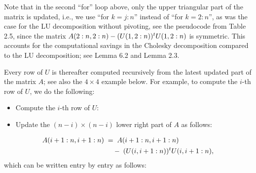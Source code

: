 Note that in the second ``for'' loop above, only the upper triangular part of the
matrix is updated, i.e., we use ``for $k = j:n$'' instead of ``for $k = 2:n$'', as was
the case for the LU decomposition without pivoting, see the pseudocode from Table 2.5,
since the matrix $A(2:n,2:n) - (U(1,2:n))^{t} U(1,2:n)$ is symmetric. This accounts for
the computational savings in the Cholesky decomposition compared to the LU
decomposition; see Lemma 6.2 and Lemma 2.3.

Every row of $U$ is thereafter computed recursively from the latest updated part of the
matrix $A$; see also the $4 \times 4$ example below. For example, to compute the
$i$-th row of $U$, we do the following:

\begin{itemize}
\item Compute the $i$-th row of $U$:
\end{itemize}

\begin{center}
\end{center}

\begin{itemize}
\item Update the $(n-i) \times (n-i)$ lower right part of $A$ as follows:
\end{itemize}
\begin{equation}
\begin{split}
A(i+1:n,i+1:n) \;&=\; A(i+1:n,i+1:n) \\
&\quad -\; (U(i,i+1:n))^{t} U(i,i+1:n),
\end{split}
\end{equation}
which can be written entry by entry as follows:

\begin{center}
\end{center}

